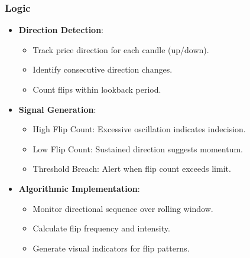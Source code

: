 \documentclass[12pt]{article}
\begin{document}
\subsubsection{Logic}
\begin{itemize}
\item \textbf{Direction Detection}:
  \begin{itemize}
  \item Track price direction for each candle (up/down).
  \item Identify consecutive direction changes.
  \item Count flips within lookback period.
  \end{itemize}
\item \textbf{Signal Generation}:
  \begin{itemize}
  \item High Flip Count: Excessive oscillation indicates indecision.
  \item Low Flip Count: Sustained direction suggests momentum.
  \item Threshold Breach: Alert when flip count exceeds limit.
  \end{itemize}
\item \textbf{Algorithmic Implementation}:
  \begin{itemize}
  \item Monitor directional sequence over rolling window.
  \item Calculate flip frequency and intensity.
  \item Generate visual indicators for flip patterns.
  \end{itemize}
\end{itemize}
\end{document}
